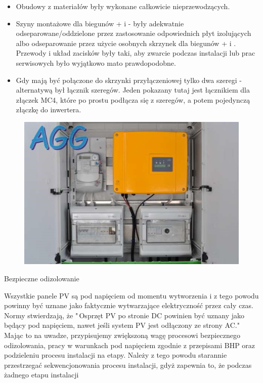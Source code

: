 \documentclass[12pt,a4paper]{article}
\begin{document}
\begin{itemize}
\item Obudowy z materiałów były wykonane całkowicie nieprzewodzących. 
\item Szyny montażowe dla biegunów + i - były adekwatnie 
odseparowane/oddzielone przez zastosowanie odpowiednich płyt izolujących 
albo odseparowanie przez użycie osobnych skrzynek dla biegunów + i . 
Przewody i układ zacisków były taki, aby zwarcie podczas instalacji lub 
prac serwisowych było wyjątkowo mato prawdopodobne. 
\item Gdy mają być połączone do skrzynki przyłączeniowej tylko dwa 
szeregi - alternatywą był łącznik szeregów. Jeden pokazany tutaj jest 
łącznikiem dla złączek MC4, które po prostu podłącza się z szeregów, a 
potem pojedynczą złączkę do inwertera. 
\end{itemize}
 

\begin{figure}[h]
\centering
\includegraphics[natwidth=15.35cm,natheight=10.20cm]{media/image25.jpg}
\end{figure}
 

 

Bezpieczne odizolowanie 

Wszystkie panele PV są pod napięciem od momentu wytworzenia i z tego 
powodu powinny być uznane jako faktycznie wytwarzające elektryczność 
przez cały czas. Normy stwierdzają, że "\,Osprzęt PV po stronie DC 
powinien być uznany jako będący pod napięciem, nawet jeśli system PV 
jest odłączony ze strony AC." Mając to na uwadze, przypisujemy 
zwiększoną wagę procesowi bezpiecznego odizolowania, pracy w warunkach 
pod napięciem zgodnie z przepisami BHP oraz podzieleniu procesu 
instalacji na etapy. Należy z tego powodu starannie przestrzegać 
sekwencjonowania procesu instalacji, gdyż zapewnia to, że podczas 
żadnego etapu instalacji 
\end{document}
